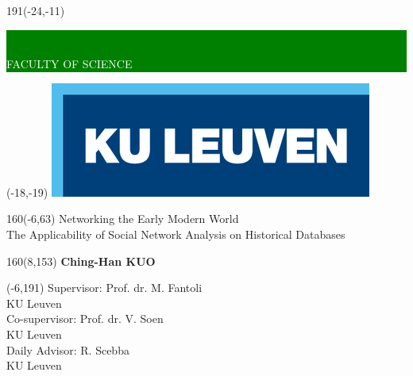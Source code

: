 \documentclass[12pt,a4paper,oneside]{book}
\begin{document}
\thispagestyle{empty}
\newcommand{\form}[1]{\scalebox{1.087}{\boldmath{#1}}}
\sffamily
%
\begin{textblock}{191}(-24,-11)
\colorbox{green}{\hspace{139mm}\ \parbox[c][18truemm]{52mm}{\textcolor{white}{FACULTY OF SCIENCE}}}
\end{textblock}
%
\begin{textblock}{70}(-18,-19)
\textblockcolour{}
\includegraphics*[height=19.8truemm]{LogoKULeuven}
\end{textblock}
%
\begin{textblock}{160}(-6,63)
\textblockcolour{}
\vspace{-\parskip}
\flushleft
\fontsize{28}{42}\selectfont \textcolor{bluetitle}{Networking the Early Modern World}\\[1.5mm]
\fontsize{15}{22}\selectfont The Applicability of Social Network Analysis on Historical Databases
\end{textblock}
%
%
\begin{textblock}{160}(8,153)
\textblockcolour{}
\vspace{-\parskip}
\flushright
\fontsize{14}{16}\selectfont \textbf{Ching-Han KUO}
\end{textblock}
%
\begin{textblock}{70}(-6,191)
\textblockcolour{}
\vspace{-\parskip}
\flushleft
Supervisor: Prof. dr. M. Fantoli\\[-2pt]
\textcolor{blueaff}{KU Leuven}\\[5pt]
Co-supervisor: Prof. dr. V. Soen\\[-2pt]
\textcolor{blueaff}{KU Leuven}\\[5pt]
Daily Advisor: R. Scebba\\[-2pt]
\textcolor{blueaff}{KU Leuven}\\[5pt]
\end{textblock}
\end{document}
